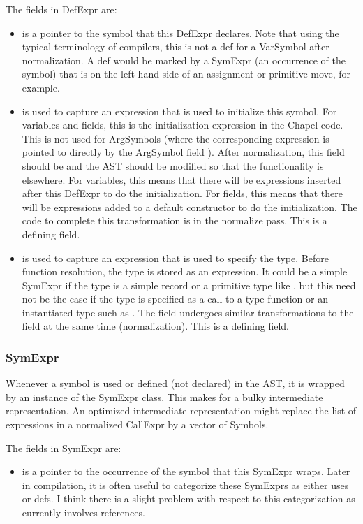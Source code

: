 \documentclass[10pt]{article}
\begin{document}
The fields in DefExpr are:
\begin{itemize}
\item {} is a pointer to the symbol that this DefExpr
  declares.  Note that using the typical terminology of compilers,
  this is not a def for a VarSymbol after normalization.  A def would
  be marked by a SymExpr (an occurrence of the symbol) that is on the
  left-hand side of an assignment or primitive move, for example.
\item {} is used to capture an expression that is used to
  initialize this symbol.  For variables and fields, this is the
  initialization expression in the Chapel code.  This is not used for
  ArgSymbols (where the corresponding expression is pointed to
  directly by the ArgSymbol field ).  After
  normalization, this field should be  and the AST should be
  modified so that the functionality is elsewhere.  For variables,
  this means that there will be expressions inserted after this
  DefExpr to do the initialization.  For fields, this means that there
  will be expressions added to a default constructor to do the
  initialization.  The code to complete this transformation is in the
  normalize pass.
  This is a defining field.
\item {} is used to capture an expression that is
  used to specify the type.  Before function resolution, the type is
  stored as an expression.  It could be a simple SymExpr if the type
  is a simple record  or a primitive type like , but
  this need not be the case if the type is specified as a call to a
  type function or an instantiated type such as .  The
   field undergoes similar transformations to the
   field at the same time (normalization).
  This is a defining field.
\end{itemize}

\subsubsection{SymExpr}
\label{sec:symexpr}

Whenever a symbol is used or defined (not declared) in the AST, it is
wrapped by an instance of the SymExpr class.  This makes for a bulky
intermediate representation.  An optimized intermediate representation
might replace the list of expressions in a normalized CallExpr by a
vector of Symbols.

The fields in SymExpr are:
\begin{itemize}
\item {} is a pointer to the occurrence of the symbol
  that this SymExpr wraps.  Later in compilation, it is often useful
  to categorize these SymExprs as either uses or defs.  I think there
  is a slight problem with respect to this categorization as currently
  involves references.
\end{itemize}
\end{document}
